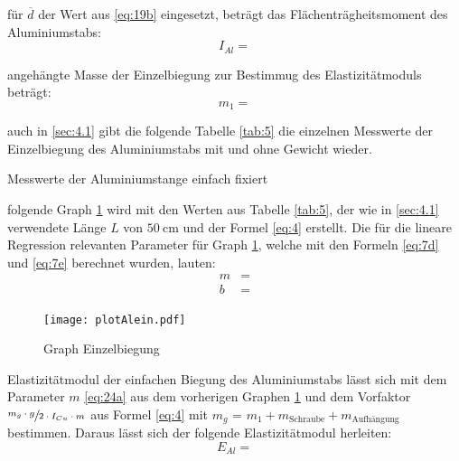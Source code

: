 \justifying für $\overline{d}$ der Wert aus \eqref{eq:19b} eingesetzt, beträgt das Flächenträgheitsmoment des Aluminiumstabs:
\begin{equation}
I_{Al} = \text{} \label{eq:22}
\end{equation}

\justifying angehängte Masse der Einzelbiegung zur Bestimmug des Elastizitätmoduls beträgt:
\begin{equation}
    m_1 = \text{} \label{eq:23}
\end{equation}

\justifying auch in \ref{sec:4.1} gibt die folgende Tabelle \ref{tab:5} die einzelnen Messwerte der Einzelbiegung des Aluminiumstabs mit und ohne Gewicht
wieder.
\begin{table}[H]
    \centering
    
    \caption{Messwerte der Aluminiumstange einfach fixiert}
    \label{tab:5}
\end{table}

\justifying  folgende Graph \ref{fig:3} wird mit den Werten aus Tabelle \ref{tab:5}, der wie in \ref{sec:4.1} verwendete Länge $L$ von
$\SI{50}{\centi\meter}$ und der Formel \eqref{eq:4} erstellt. Die für die lineare Regression relevanten Parameter für Graph \ref{fig:3}, welche mit 
den Formeln \eqref{eq:7d} und \eqref{eq:7e} berechnet wurden,
lauten:
\begin{subequations}\label{eq:24}
\begin{align}
    m &= \text{} \label{eq:24a}\\
    b &= \text{} \label{eq:24b}
\end{align}
\end{subequations}

\begin{figure}[H]
    \centering
    \texttt{[image: plotAlein.pdf]}
    \caption{Graph Einzelbiegung}
    \label{fig:3}
\end{figure}

\justifying Elastizitätmodul der einfachen Biegung des Aluminiumstabs lässt sich mit dem Parameter $m$ \eqref{eq:24a} aus dem
vorherigen Graphen \ref{fig:3} und dem Vorfaktor $\sfrac{m_g \cdot g}{2 \cdot I_{Cu} \cdot m}$ aus Formel \eqref{eq:4} mit $m_g$ = $m_1 + 
m_{\text{Schraube}} + m_{\text{Aufhängung}}$ bestimmen. Daraus lässt sich der folgende Elastizitätmodul herleiten:
\begin{equation}
E_{Al} =  \label{eq:25}
\end{equation}

